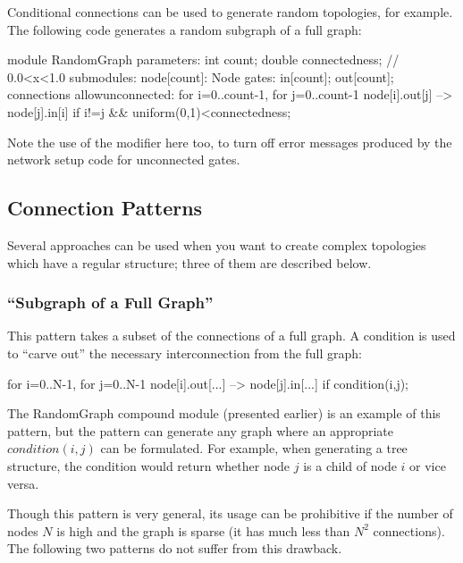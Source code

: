Conditional connections can be used to generate random
topologies, for example. The following code
generates a random subgraph of a full graph:

\begin{ned}
module RandomGraph {
    parameters:
        int count;
        double connectedness; // 0.0<x<1.0
    submodules:
        node[count]: Node {
            gates:
                in[count];
                out[count];
        }
    connections allowunconnected:
        for i=0..count-1, for j=0..count-1 {
            node[i].out[j] --> node[j].in[i]
                if i!=j && uniform(0,1)<connectedness;
        }
}
\end{ned}

Note the use of the  modifier
here too, to turn off error messages produced by the network setup code
for unconnected gates.


\subsection{Connection Patterns}


Several approaches can be used when you want to create complex
topologies which have a regular structure; three of them are
described below.


\subsubsection{``Subgraph of a Full Graph''}


This pattern takes a subset of the connections of a full graph.  A
condition is used to ``carve out'' the necessary interconnection from
the full graph:

\begin{ned}
for i=0..N-1, for j=0..N-1 {
    node[i].out[...] --> node[j].in[...] if condition(i,j);
}
\end{ned}

The RandomGraph compound module (presented earlier) is an example of
this pattern, but the pattern can generate any graph where an
appropriate $condition(i,j)$ can be formulated. For example,
when generating a tree structure, the condition
would return whether node $j$ is a child of node $i$ or
vice versa.

Though this pattern is very general, its usage can be prohibitive if
the number of nodes $N$ is high and the graph is sparse (it has
much less than $N^2$ connections). The following
two patterns do not suffer from this drawback.


